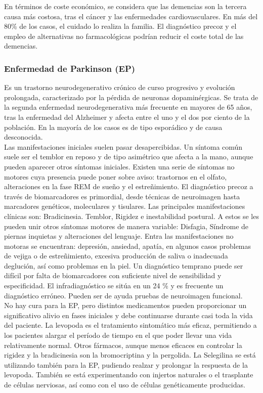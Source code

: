 En términos de coste económico, se considera que las demencias son la tercera causa más costosa, tras el cáncer y las enfermedades cardiovasculares. En más del 80\% de los casos, el cuidado lo realiza la familia. El diagnóstico precoz y el empleo de alternativas no farmacológicas podrían reducir el coste total de las demencias.		

\subsubsection{Enfermedad de Parkinson (EP)}

Es un trastorno neurodegenerativo crónico de curso progresivo y evolución prolongada, caracterizado por la pérdida de neuronas dopaminérgicas. Se trata de la segunda enfermedad neurodegenerativa más frecuente en mayores de 65 años, tras la enfermedad del Alzheimer y afecta entre el uno y el dos por ciento de la población. En la mayoría de los casos es de tipo esporádico y de causa desconocida.\\

Las manifestaciones iniciales suelen pasar desapercibidas. Un síntoma común suele ser el temblor en reposo y de tipo asimétrico que afecta a la mano, aunque pueden aparecer otros síntomas iniciales. Existen una serie de síntomas no motores cuya presencia puede poner sobre aviso: trastornos en el olfato, alteraciones en la fase REM de sueño y el estreñimiento. El diagnóstico precoz a través de biomarcadores es primordial, desde técnicas de neuroimagen hasta marcadores genéticos, moleculares y tisulares. Las principales manifestaciones clínicas son: Bradicinesia. Temblor, Rigidez e inestabilidad postural. A estos se les pueden unir otros síntomas motores de manera variable: Disfagia, Síndrome de piernas inquietas y alteraciones del lenguaje. Entra las manifestaciones no motoras se encuentran: depresión, ansiedad, apatía,  en algunos casos problemas de vejiga o de estreñimiento, excesiva producción de saliva o inadecuada deglución, así como problemas en la piel. Un diagnóstico temprano puede ser difícil por falta de biomarcadores con suficiente nivel de sensibilidad y especificidad. El infradiagnóstico se sitúa en un 24 \% y es frecuente un diagnóstico erróneo. Pueden ser de ayuda pruebas de neuroimagen funcional.\\

No hay cura para la EP, pero distintos medicamentos pueden proporcionar un significativo alivio en fases iniciales y debe continuarse durante casi toda la vida del paciente. La levopoda es el tratamiento sintomático más eficaz, permitiendo a los pacientes alargar el período de tiempo en el que poder llevar una vida relativamente normal. Otros fármacos, aunque menos eficaces en controlar la rigidez y la bradicinesia son la bromocriptina y la pergolida. La Selegilina se está utilizando también para la EP, pudiendo realzar y prolongar la respuesta de la levopoda. También se está experimentando con injertos naturales o el trasplante de células nerviosas, así como con el uso de células genéticamente producidas.\\

